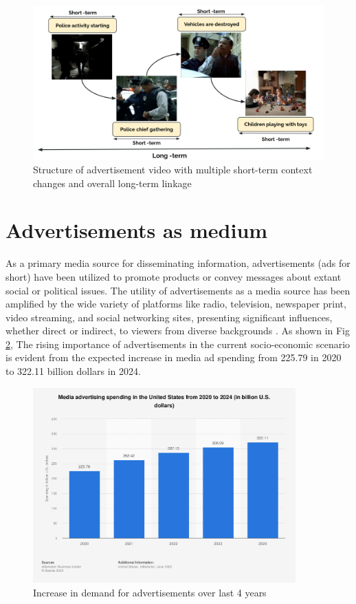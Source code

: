 \begin{figure}[h!]
\centering
\includegraphics[width=\textwidth]{figures/ads_structure_figure.png}
\caption{Structure of advertisement video with multiple short-term context changes and overall long-term linkage}
\label{ads_structure_set}
\end{figure}

\section{Advertisements as medium}
As a primary media source for disseminating information, advertisements (ads for short) have been utilized to promote products or convey messages about extant social or political issues. The utility of advertisements as a media source has been amplified by the wide variety of platforms like radio, television, newspaper print, video streaming, and social networking sites, presenting significant influences, whether direct or indirect, to viewers from diverse backgrounds \cite{Pardun}. As shown in Fig \ref{ads_structure_set}, The rising importance of advertisements in the current socio-economic scenario is evident from the expected increase in media ad spending from 225.79 in 2020 to 322.11 billion dollars in 2024.

\begin{figure}[h!]
\centering
\includegraphics[width=0.9\textwidth]{figures/statistic_id272314_advertising-spending-in-the-us-2020-2024.png}
\caption{Increase in demand for advertisements over last 4 years}
\label{ads_structure_set}
\end{figure}

